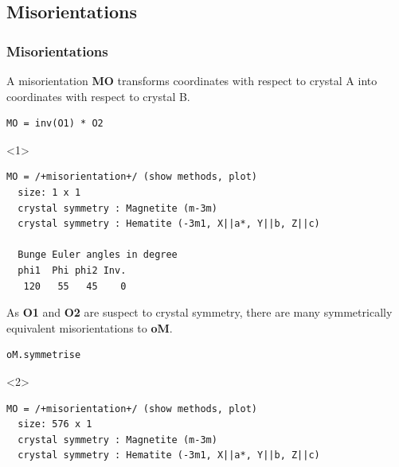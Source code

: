 \documentclass[compress]{beamer}
\begin{document}
\begin{frame}[fragile]
\begin{overlayarea}{\textwidth}{8cm}
\begin{onlyenv}
\begin{lstlisting}[style=output]
\end{lstlisting}
  \end{onlyenv}

\end{overlayarea}

\end{frame}



\subsection*{Misorientations}
\label{sec:orientations2}

\begin{frame}[fragile]
  \frametitle{Misorientations}

  \begin{overlayarea}{\textwidth}{8cm}

  A \alert{misorientation} {\bf MO} transforms coordinates with respect to
  crystal A into coordinates with respect to crystal B.
\vspace{-0.1cm}
\begin{lstlisting}[style=input]
MO = inv(O1) * O2
\end{lstlisting}

\begin{onlyenv}<1>
  \vspace{-.3cm}
  \begin{lstlisting}[style=output]
MO = /+misorientation+/ (show methods, plot)
  size: 1 x 1
  crystal symmetry : Magnetite (m-3m)
  crystal symmetry : Hematite (-3m1, X||a*, Y||b, Z||c)

  Bunge Euler angles in degree
  phi1  Phi phi2 Inv.
   120   55   45    0
\end{lstlisting}
\end{onlyenv}

  \pause
  \medskip

As \textbf{O1} and \textbf{O2} are suspect to crystal symmetry, there are  many
symmetrically equivalent misorientations to \textbf{oM}.

\vspace{-0.1cm}
\begin{lstlisting}[style=input]
oM.symmetrise
\end{lstlisting}

\begin{onlyenv}<2>
  \vspace{-.3cm}
  \begin{lstlisting}[style=output]
MO = /+misorientation+/ (show methods, plot)
  size: 576 x 1
  crystal symmetry : Magnetite (m-3m)
  crystal symmetry : Hematite (-3m1, X||a*, Y||b, Z||c)
\end{lstlisting}
\end{onlyenv}


\end{overlayarea}
\end{frame}
\end{document}
